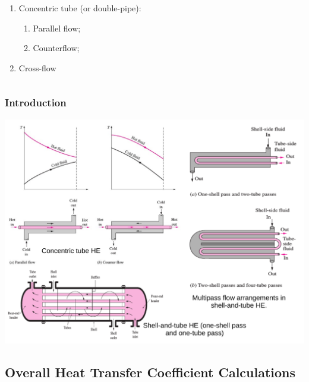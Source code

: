 \documentclass[10pt,compress,unknownkeysallowed]{beamer}
\begin{document}
\begin{frame}
\begin{columns}
\begin{column}[l]{0.5\linewidth}
\begin{enumerate}
              \begin{enumerate}\scriptsize
                  \item<3-> Concentric tube (or double-pipe):
                       \begin{enumerate}\scriptsize
                          \item<3-> Parallel flow;
                          \item<3-> Counterflow;
                       \end{enumerate}
                  \item<3-> Cross-flow
              \end{enumerate}
         \end{enumerate}
       \end{column}      
    \end{columns}
\end{frame}


\begin{frame}
  \frametitle{Introduction}
    \begin{center}
         \includegraphics[width=1.\columnwidth,height=0.65\columnwidth,clip]{./Pics/HeatExchangers_Classification2}
    \end{center}
\end{frame}


\subsection{Overall Heat Transfer Coefficient Calculations}
\end{document}
